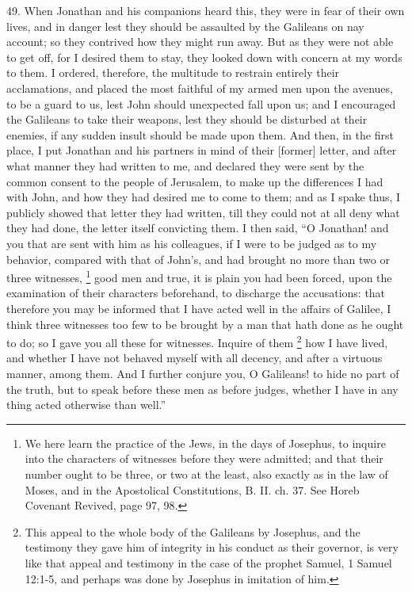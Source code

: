 49. When Jonathan and his companions heard this, they were in fear of
their own lives, and in danger lest they should be assaulted by the
Galileans on nay account; so they contrived how they might run away. But
as they were not able to get off, for I desired them to stay, they looked
down with concern at my words to them. I ordered, therefore, the multitude
to restrain entirely their acclamations, and placed the most faithful of
my armed men upon the avenues, to be a guard to us, lest John should
unexpected fall upon us; and I encouraged the Galileans to take their
weapons, lest they should be disturbed at their enemies, if any sudden
insult should be made upon them. And then, in the first place, I put
Jonathan and his partners in mind of their [former] letter, and after what
manner they had written to me, and declared they were sent by the common
consent to the people of Jerusalem, to make up the differences I had with
John, and how they had desired me to come to them; and as I spake thus, I
publicly showed that letter they had written, till they could not at all
deny what they had done, the letter itself convicting them. I then said,
``O Jonathan! and you that are sent with him as his colleagues, if I were
to be judged as to my behavior, compared with that of John's, and had
brought no more than two or three witnesses, \footnote{We here learn the
practice of the Jews, in the days of Josephus, to inquire into the
characters of witnesses before they were admitted; and that their number
ought to be three, or two at the least, also exactly as in the law of
Moses, and in the Apostolical Constitutions, B. II. ch. 37. See Horeb
Covenant Revived, page 97, 98.} good men
and true, it is plain you had been forced, upon the examination of their
characters beforehand, to discharge the accusations: that therefore you
may be informed that I have acted well in the affairs of Galilee, I think
three witnesses too few to be brought by a man that hath done as he ought
to do; so I gave you all these for witnesses. Inquire of them \footnote{This appeal to the whole
body of the Galileans by Josephus, and the testimony they gave him of
integrity in his conduct as their governor, is very like that appeal and
testimony in the case of the prophet Samuel, 1 Samuel 12:1-5, and perhaps
was done by Josephus in imitation of him.}
how I have lived, and whether I have not behaved myself with all decency,
and after a virtuous manner, among them. And I further conjure you, O
Galileans! to hide no part of the truth, but to speak before these men as
before judges, whether I have in any thing acted otherwise than well.''

